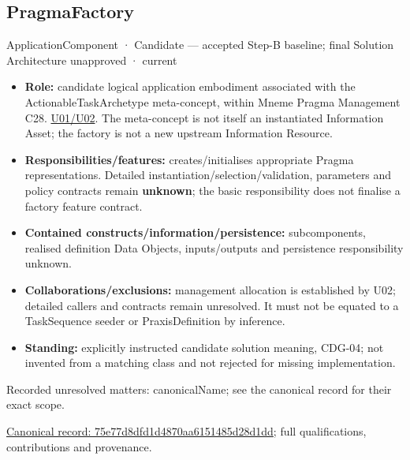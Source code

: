 \subsection{PragmaFactory}

\label{element:75e77d8dfd1d4870aa6151485d28d1dd}
{\small ApplicationComponent · Candidate — accepted Step-B baseline; final Solution Architecture unapproved · current}\par

\begin{itemize}


\item \textbf{Role:} candidate logical application embodiment associated with the
  ActionableTaskArchetype meta-concept, within Mneme Pragma Management C28.
  \href{\detokenize{../../../../../docs/markdown/05-information-systems-architecture/sources.md#u02}}{U01/U02}. The meta-concept is not itself an instantiated
  Information Asset; the factory is not a new upstream Information Resource.

\item \textbf{Responsibilities/features:} creates/initialises appropriate Pragma
  representations. Detailed instantiation/selection/validation, parameters and
  policy contracts remain \textbf{unknown}; the basic responsibility does not finalise
  a factory feature contract.

\item \textbf{Contained constructs/information/persistence:} subcomponents, realised
  definition Data Objects, inputs/outputs and persistence responsibility unknown.

\item \textbf{Collaborations/exclusions:} management allocation is established by U02;
  detailed callers and contracts remain unresolved. It must not be equated to a
  TaskSequence seeder or PraxisDefinition by inference.

\item \textbf{Standing:} explicitly instructed candidate solution meaning, CDG-04; not
  invented from a matching class and not rejected for missing implementation.

\end{itemize}

{\small Recorded unresolved matters: canonicalName; see the canonical record for their exact scope.}\par
{\footnotesize \href{../../../../continuum/application/application-component/75e77d8dfd1d4870aa6151485d28d1dd.md}{Canonical record: 75e77d8dfd1d4870aa6151485d28d1dd}; full qualifications, contributions and provenance.}\par
